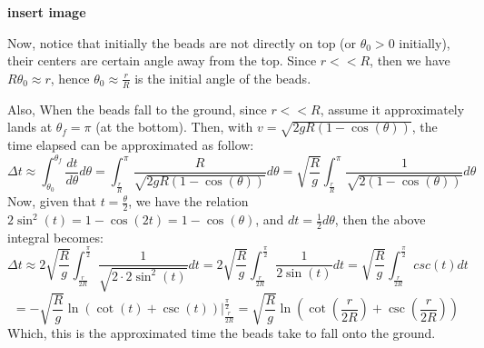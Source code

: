 \documentclass{article}
\begin{document}
\textbf{insert image}

Now, notice that initially the beads are not directly on top (or $\theta_0>0$ initially), their centers are certain angle away from the top. Since $r<<R$, then we have $R\theta_0 \approx r$, hence $\theta_0 \approx \frac{r}{R}$ is the initial angle of the beads.

Also, When the beads fall to the ground, since $r<<R$, assume it approximately lands at $\theta_f=\pi$ (at the bottom). Then, with $v=\sqrt{2gR(1-\cos(\theta))}$, the time elapsed can be approximated as follow:
$$\Delta t \approx \int_{\theta_0}^{\theta_f}\frac{dt}{d\theta}d\theta = \int_{\frac{r}{R}}^{\pi}\frac{R}{\sqrt{2gR(1-\cos(\theta))}}d\theta = \sqrt{\frac{R}{g}}\int_{\frac{r}{R}}^{\pi}\frac{1}{\sqrt{2(1-\cos(\theta))}}d\theta$$
Now, given that $t=\frac{\theta}{2}$, we have the relation $2\sin^2(t) = 1-\cos(2t) = 1-\cos(\theta)$, and $dt = \frac{1}{2}d\theta$, then the above integral becomes:
$$\Delta t \approx 2\sqrt{\frac{R}{g}}\int_{\frac{r}{2R}}^{\frac{\pi}{2}}\frac{1}{\sqrt{2\cdot 2\sin^2(t)}}dt = 2\sqrt{\frac{R}{g}}\int_{\frac{r}{2R}}^{\frac{\pi}{2}}\frac{1}{2\sin(t)}dt = \sqrt{\frac{R}{g}}\int_{\frac{r}{2R}}^{\frac{\pi}{2}}csc(t)dt$$
$$ = -\sqrt{\frac{R}{g}}\ln(\cot(t)+\csc(t))\bigg|_{\frac{r}{2R}}^{\frac{\pi}{2}} = \sqrt{\frac{R}{g}}\ln\left(\cot\left(\frac{r}{2R}\right)+\csc\left(\frac{r}{2R}\right)\right)$$
Which, this is the approximated time the beads take to fall onto the ground.

\break
\end{document}
